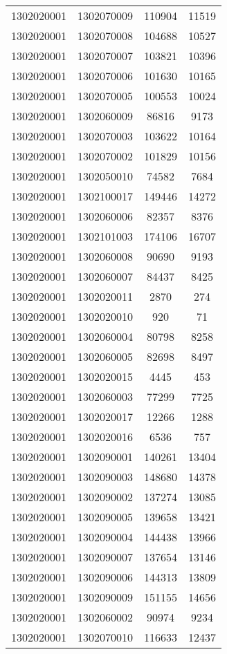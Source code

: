 \begin{longtable}{llcc}
1302020001 & 1302070009 & 110904 & 11519\\
1302020001 & 1302070008 & 104688 & 10527\\
1302020001 & 1302070007 & 103821 & 10396\\
1302020001 & 1302070006 & 101630 & 10165\\
1302020001 & 1302070005 & 100553 & 10024\\
1302020001 & 1302060009 & 86816 & 9173\\
1302020001 & 1302070003 & 103622 & 10164\\
1302020001 & 1302070002 & 101829 & 10156\\
1302020001 & 1302050010 & 74582 & 7684\\
1302020001 & 1302100017 & 149446 & 14272\\
1302020001 & 1302060006 & 82357 & 8376\\
1302020001 & 1302101003 & 174106 & 16707\\
1302020001 & 1302060008 & 90690 & 9193\\
1302020001 & 1302060007 & 84437 & 8425\\
1302020001 & 1302020011 & 2870 & 274\\
1302020001 & 1302020010 & 920 & 71\\
1302020001 & 1302060004 & 80798 & 8258\\
1302020001 & 1302060005 & 82698 & 8497\\
1302020001 & 1302020015 & 4445 & 453\\
1302020001 & 1302060003 & 77299 & 7725\\
1302020001 & 1302020017 & 12266 & 1288\\
1302020001 & 1302020016 & 6536 & 757\\
1302020001 & 1302090001 & 140261 & 13404\\
1302020001 & 1302090003 & 148680 & 14378\\
1302020001 & 1302090002 & 137274 & 13085\\
1302020001 & 1302090005 & 139658 & 13421\\
1302020001 & 1302090004 & 144438 & 13966\\
1302020001 & 1302090007 & 137654 & 13146\\
1302020001 & 1302090006 & 144313 & 13809\\
1302020001 & 1302090009 & 151155 & 14656\\
1302020001 & 1302060002 & 90974 & 9234\\
1302020001 & 1302070010 & 116633 & 12437\\

\end{longtable}
